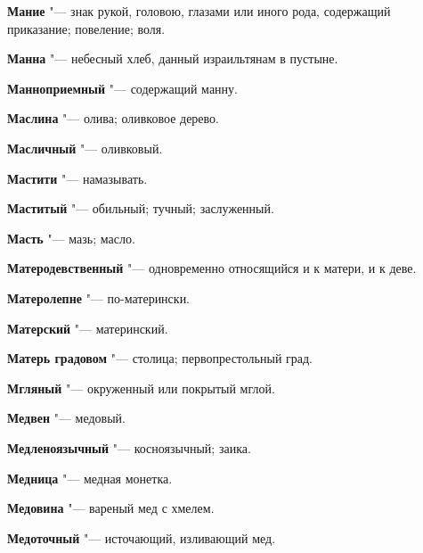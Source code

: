 \begin{mymulticols}{2}
\noindent\textbf{Мание} "--- знак рукой, головою, глазами или иного рода, содержащий приказание; повеление; воля. 




\noindent\textbf{Манна} "--- небесный хлеб, данный израильтянам в пустыне. 




\noindent\textbf{Манноприемный} "--- содержащий манну. 




\noindent\textbf{Маслина} "--- олива; оливковое дерево. 




\noindent\textbf{Масличный} "--- оливковый. 




\noindent\textbf{Мастити} "--- намазывать. 




\noindent\textbf{Маститый} "--- обильный; тучный; заслуженный. 




\noindent\textbf{Масть} "--- мазь; масло. 




\noindent\textbf{Матеродевственный} "--- одновременно относящийся и к матери, и к деве. 




\noindent\textbf{Матеролепне} "--- по-матерински. 




\noindent\textbf{Матерский} "--- материнский. 




\noindent\textbf{Матерь градовом} "--- столица; первопрестольный град. 




\noindent\textbf{Мгляный} "--- окруженный или покрытый мглой. 




\noindent\textbf{Медвен} "--- медовый. 




\noindent\textbf{Медленоязычный} "--- косноязычный; заика. 




\noindent\textbf{Медница} "--- медная монетка. 




\noindent\textbf{Медовина} "--- вареный мед с хмелем. 




\noindent\textbf{Медоточный} "--- источающий, изливающий мед. 





\end{mymulticols}
